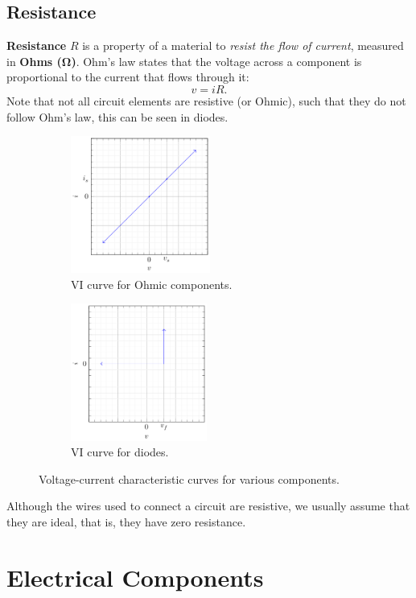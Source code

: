 \documentclass{report}
\begin{document}
\subsection{Resistance}
\textbf{Resistance} \(R\) is a property of a material to \textit{resist the flow of current}, measured in \textbf{Ohms (\unit{\ohm})}.
Ohm's law states that the voltage across a component is proportional to the current that flows through it:
\begin{equation*}
    v = i R.
\end{equation*}
Note that not all circuit elements are resistive (or Ohmic), such that they
do not follow Ohm's law, this can be seen in diodes.
\begin{figure}[H]
    \centering
    \begin{subfigure}{0.47\linewidth}
        \centering
        \includegraphics[height=4.5cm]{figures/vi_ohmic.pdf}
        \caption{VI curve for Ohmic components.}
    \end{subfigure}
    \begin{subfigure}{0.47\linewidth}
        \centering
        \includegraphics[height=4.5cm]{figures/vi_diode.pdf}
        \caption{VI curve for diodes.}
    \end{subfigure}
    \caption{Voltage-current characteristic curves for various components.}
\end{figure}
Although the wires used to connect a circuit are resistive, we usually assume that they are ideal, that is,
they have zero resistance.
\section{Electrical Components}
\end{document}
